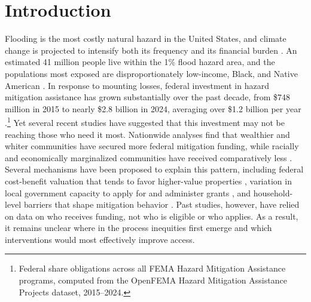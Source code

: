 \documentclass[
  authoryear,
  preprint]{elsarticle}
\begin{document}
\section{Introduction}\label{introduction}

Flooding is the most costly natural hazard in the United States, and
climate change is projected to intensify both its frequency and its
financial burden
\citep{noaanationalcentersforenvironmentalinformationUSBillionDollarWeather2024}.
An estimated 41 million people live within the 1\% flood hazard area,
and the populations most exposed are disproportionately low-income,
Black, and Native American \citep{tateFloodExposureSocial2021}. In
response to mounting losses, federal investment in hazard mitigation
assistance has grown substantially over the past decade, from \$748
million in 2015 to nearly \$2.8 billion in 2024, averaging over \$1.2
billion per year \citep{femaOpenFEMAHMA}.\footnote{Federal share
  obligations across all FEMA Hazard Mitigation Assistance programs,
  computed from the OpenFEMA Hazard Mitigation Assistance Projects
  dataset, 2015--2024.} Yet several recent studies have suggested that
this investment may not be reaching those who need it most. Nationwide
analyses find that wealthier and whiter communities have secured more
federal mitigation funding, while racially and economically marginalized
communities have received comparatively less
\citep{machManagedRetreatVoluntary2019, elliottRacialInequitiesFederal2020a, loughranUnequalRetreatsHow2022}.
Several mechanisms have been proposed to explain this pattern, including
federal cost-benefit valuation that tends to favor higher-value
properties \citep{elliottRacialInequitiesFederal2020a}, variation in
local government capacity to apply for and administer grants
\citep{machManagedRetreatVoluntary2019}, and household-level barriers
that shape mitigation behavior
\citep{bubeck2012review, binderUpheavalUnpackingDynamic2023}. Past
studies, however, have relied on data on who receives funding, not who
is eligible or who applies. As a result, it remains unclear where in the
process inequities first emerge and which interventions would most
effectively improve access.
\end{document}
